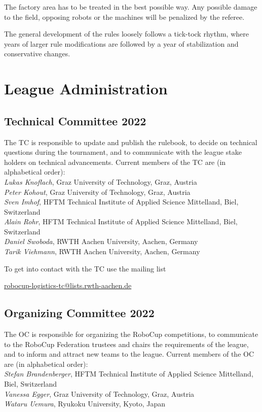 \documentclass[12pt,twoside]{article}
\begin{document}
The factory area has to be treated in the best possible way.
Any possible damage to the field, opposing robots or the machines will be
penalized by the referee.

The general development of the rules loosely follows a tick-tock
rhythm, where years of larger rule modifications are followed by a
year of stabilization and conservative changes.


\section{League Administration} \label{sec:commitees}
\subsection{Technical Committee 2022}
\label{sec:tc}
The \acf{TC} is responsible to update and publish the
rulebook, to decide on technical questions during the tournament, and
to communicate with the league stake holders on technical
advancements. Current members of the \ac{TC} are
(in alphabetical order):\\[.5em]
\emph{Lukas Knoflach}, Graz University of Technology, Graz, Austria\\
\emph{Peter Kohout}, Graz University of Technology, Graz, Austria\\
\emph{Sven Imhof}, HFTM Technical Institute of Applied Science Mittelland,
Biel, Switzerland\\
\emph{Alain Rohr}, HFTM Technical Institute of Applied Science Mittelland,
Biel, Switzerland\\
\emph{Daniel Swoboda}, RWTH Aachen University, Aachen, Germany\\
\emph{Tarik Viehmann}, RWTH Aachen University, Aachen, Germany

\medskip
\noindent To get into contact with the \ac{TC} use the mailing list\\
\centerline{\url{robocup-logistics-tc@lists.rwth-aachen.de}}

\subsection{Organizing Committee 2022}
\label{sec:oc}
The \ac{OC} is responsible for organizing the
RoboCup competitions, to communicate to the RoboCup Federation
trustees and chairs the requirements of the league, and to inform and
attract new teams to the league. Current members of the \ac{OC} are (in
alphabetical order):\\[.5em]
\emph{Stefan Brandenberger}, HFTM Technical Institute of Applied Science
Mittelland, Biel, Switzerland\\
\emph{Vanessa Egger}, Graz University of Technology, Graz, Austria\\
\emph{Wataru Uemura}, Ryukoku University, Kyoto, Japan
\end{document}
